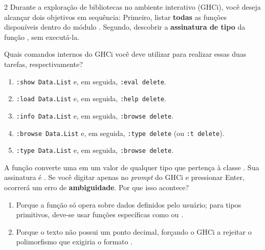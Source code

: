 \documentclass[a4paper,10pt,brazil]{article}
\begin{document}
\begin{multicols}{2}
Durante a exploração de bibliotecas no ambiente interativo (GHCi), você deseja alcançar dois objetivos em sequência:
Primeiro, listar \textbf{todas} as funções disponíveis dentro do módulo .
Segundo, descobrir a \textbf{assinatura de tipo} da função , sem executá-la.

Quais comandos internos do GHCi você deve utilizar para realizar essas duas tarefas, respectivamente?

\begin{enumerate}
  \item \texttt{:show Data.List} e, em seguida, \texttt{:eval delete}.

  \item \texttt{:load Data.List} e, em seguida, \texttt{:help delete}.

  \item \texttt{:info Data.List} e, em seguida, \texttt{:browse delete}.

  \item \texttt{:browse Data.List} e, em seguida, \texttt{:type delete} (ou \texttt{:t delete}).

  \item \texttt{:type Data.List} e, em seguida, \texttt{:browse delete}.


\end{enumerate}

A função  converte uma  em um valor de qualquer tipo que pertença à classe . Sua assinatura é . 
Se você digitar apenas  no \emph{prompt} do GHCi e pressionar Enter, ocorrerá um erro de \textbf{ambiguidade}. Por que isso acontece?

\begin{enumerate}
  \item Porque a função  só opera sobre dados definidos pelo usuário; para tipos primitivos, deve-se usar funções específicas como  ou .

  \item Porque o texto  não possui um ponto decimal, forçando o GHCi a rejeitar o polimorfismo que exigiria o formato .


\end{enumerate}
\end{multicols}
\end{document}
